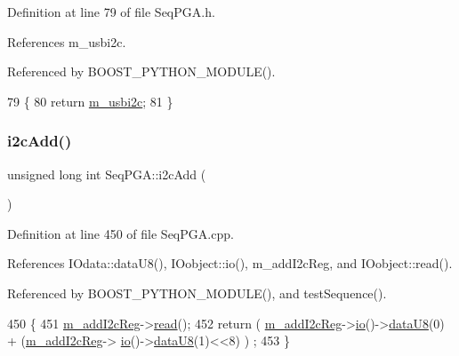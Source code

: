 Definition at line 79 of file Seq\+P\+G\+A.\+h.



References m\+\_\+usbi2c.



Referenced by B\+O\+O\+S\+T\+\_\+\+P\+Y\+T\+H\+O\+N\+\_\+\+M\+O\+D\+U\+L\+E().


\begin{DoxyCode}
79                     \{
80     \textcolor{keywordflow}{return} \hyperlink{classSeqPGA_a31d692cdc2f70dfd71671f3e2d688e20}{m\_usbi2c};
81   \}
\end{DoxyCode}
\mbox{\label{classSeqPGA_a67022684977cb2f6335eb6b21262fe89}} 
\subsubsection{\texorpdfstring{i2c\+Add()}{i2cAdd()}}
{\footnotesize\ttfamily unsigned long int Seq\+P\+G\+A\+::i2c\+Add (\begin{DoxyParamCaption}{ }\end{DoxyParamCaption})}



Definition at line 450 of file Seq\+P\+G\+A.\+cpp.



References I\+Odata\+::data\+U8(), I\+Oobject\+::io(), m\+\_\+add\+I2c\+Reg, and I\+Oobject\+::read().



Referenced by B\+O\+O\+S\+T\+\_\+\+P\+Y\+T\+H\+O\+N\+\_\+\+M\+O\+D\+U\+L\+E(), and test\+Sequence().


\begin{DoxyCode}
450                                 \{
451   \hyperlink{classSeqPGA_ac3a6aad3fec65ceb78528b6d20deeb3f}{m\_addI2cReg}->\hyperlink{classIOobject_aa07610c11963b1db6710e3c76ceea456}{read}();
452   \textcolor{keywordflow}{return} ( \hyperlink{classSeqPGA_ac3a6aad3fec65ceb78528b6d20deeb3f}{m\_addI2cReg}->\hyperlink{classIOobject_af04fb94137c3d86849f478ac5afab5d1}{io}()->\hyperlink{classIOdata_a75e9c318dbac3a39402179070943d4bc}{dataU8}(0) + (\hyperlink{classSeqPGA_ac3a6aad3fec65ceb78528b6d20deeb3f}{m\_addI2cReg}->
      \hyperlink{classIOobject_af04fb94137c3d86849f478ac5afab5d1}{io}()->\hyperlink{classIOdata_a75e9c318dbac3a39402179070943d4bc}{dataU8}(1)<<8) ) ;
453 \}
\end{DoxyCode}
\mbox{\label{classSeqPGA_a3d441522bfe5a6d35b8a77cbcd38b49e}} 

